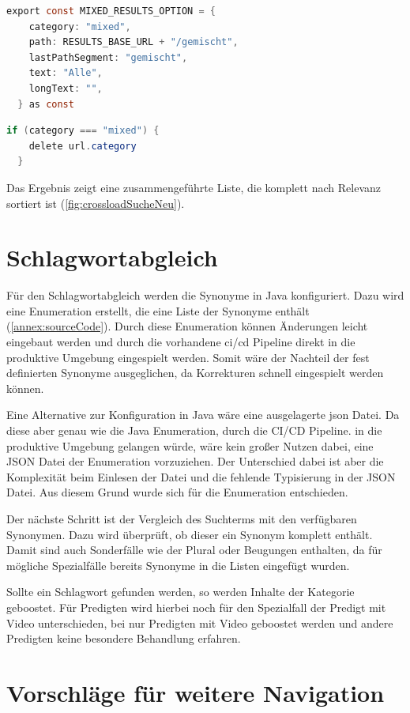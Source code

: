 \begin{lstlisting}[language=Java, title={Erstellen der gemischten Kategorie \cite{frontend2022}}]
  export const MIXED_RESULTS_OPTION = {
    category: "mixed",
    path: RESULTS_BASE_URL + "/gemischt",
    lastPathSegment: "gemischt",
    text: "Alle",
    longText: "",
  } as const
\end{lstlisting}

\begin{lstlisting}[language=Java, title={Löschen der Kategorie aus den API Parametern \cite{frontend2022}}]
  if (category === "mixed") {
    delete url.category
  }
\end{lstlisting}

Das Ergebnis zeigt eine zusammengeführte Liste, die komplett nach Relevanz sortiert ist (\ref{fig:crossloadSucheNeu}).

\section{Schlagwortabgleich}
\label{sec:devKeywords}

Für den Schlagwortabgleich werden die Synonyme in Java konfiguriert.
Dazu wird eine Enumeration erstellt, die eine Liste der Synonyme enthält (\ref{annex:sourceCode}).
Durch diese Enumeration können Änderungen leicht eingebaut werden und durch die vorhandene \gls{ci}/\gls{cd} Pipeline direkt in die produktive Umgebung eingespielt werden.
Somit wäre der Nachteil der fest definierten Synonyme ausgeglichen, da Korrekturen schnell eingespielt werden können.

Eine Alternative zur Konfiguration in Java wäre eine ausgelagerte \gls{json} Datei.
Da diese aber genau wie die Java Enumeration, durch die CI/CD Pipeline. in die produktive Umgebung gelangen würde, wäre kein großer Nutzen dabei, eine JSON Datei der Enumeration vorzuziehen.
Der Unterschied dabei ist aber die Komplexität beim Einlesen der Datei und die fehlende Typisierung in der JSON Datei.
Aus diesem Grund wurde sich für die Enumeration entschieden.

Der nächste Schritt ist der Vergleich des Suchterms mit den verfügbaren Synonymen.
Dazu wird überprüft, ob dieser ein Synonym komplett enthält.
Damit sind auch Sonderfälle wie der Plural oder Beugungen enthalten, da für mögliche Spezialfälle bereits Synonyme in die Listen eingefügt wurden.

Sollte ein Schlagwort gefunden werden, so werden Inhalte der Kategorie geboostet.
Für Predigten wird hierbei noch für den Spezialfall der Predigt mit Video unterschieden, bei nur Predigten mit Video geboostet werden und andere Predigten keine besondere Behandlung erfahren.

\section{Vorschläge für weitere Navigation}
\label{sec:devSuggestions}

